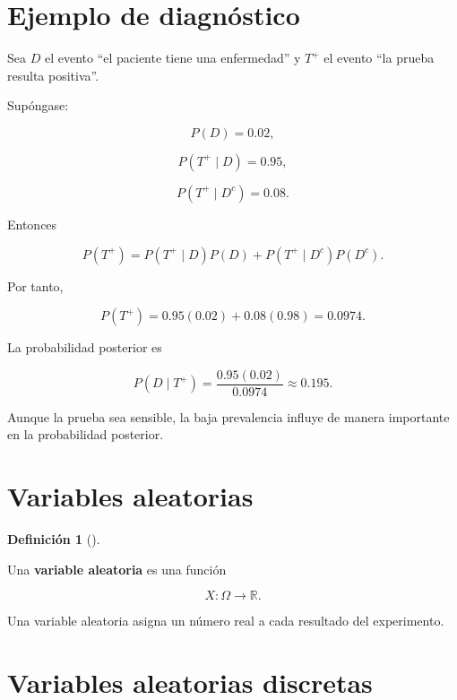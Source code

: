 \documentclass[
  spanish,
  10.5pt,
  letterpaper,
  DIV=11,
  numbers=noendperiod,
  oneside,
  open=any]{scrreprt}
\theoremstyle{definition}
\newtheorem{definition}{Definición}[chapter]
\theoremstyle{definition}
\theoremstyle{plain}
\theoremstyle{remark}
\begin{document}
\section*{Ejemplo de diagnóstico}\label{ejemplo-de-diagnuxf3stico}


Sea \(D\) el evento ``el paciente tiene una enfermedad'' y \(T^+\) el
evento ``la prueba resulta positiva''.

Supóngase:

\[
P(D)=0.02,
\]

\[
P(T^+\mid D)=0.95,
\]

\[
P(T^+\mid D^c)=0.08.
\]

Entonces

\[
P(T^+)
=
P(T^+\mid D)P(D)
+
P(T^+\mid D^c)P(D^c).
\]

Por tanto,

\[
P(T^+)
=
0.95(0.02)+0.08(0.98)
=
0.0974.
\]

La probabilidad posterior es

\[
P(D\mid T^+)
=
\frac{0.95(0.02)}{0.0974}
\approx 0.195.
\]

Aunque la prueba sea sensible, la baja prevalencia influye de manera
importante en la probabilidad posterior.

\section*{Variables aleatorias}\label{variables-aleatorias}


\begin{definition}[]\protect\hypertarget{def-variable-aleatoria}{}\label{def-variable-aleatoria}

Una \textbf{variable aleatoria} es una
función

\[
X:\Omega\to\mathbb{R}.
\]

\end{definition}

Una variable aleatoria asigna un número real a cada resultado del
experimento.

\section*{Variables aleatorias
discretas}\label{variables-aleatorias-discretas}
\end{document}
